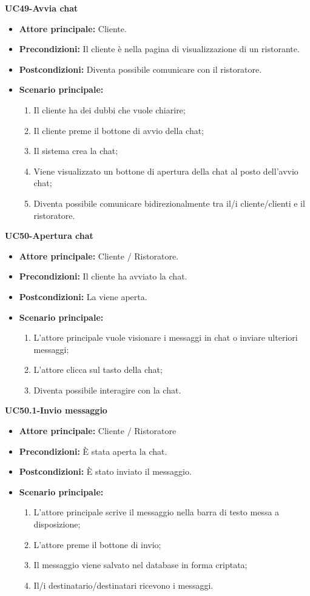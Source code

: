 
\textbf{UC49-Avvia chat}
\begin{itemize}
\item \textbf{Attore principale:} Cliente.
\item \textbf{Precondizioni:} Il cliente è nella pagina di visualizzazione di un ristorante.
\item \textbf{Postcondizioni:} Diventa possibile comunicare con il ristoratore.
\item \textbf{Scenario principale:}
\begin{enumerate}
    \item Il cliente ha dei dubbi che vuole chiarire;
    \item Il cliente preme il bottone di avvio della chat;
    \item Il sistema crea la chat;
    \item Viene visualizzato un bottone di apertura della chat al posto dell'avvio chat;
    \item Diventa possibile comunicare bidirezionalmente tra il/i cliente/clienti e il ristoratore.
\end{enumerate}
\end{itemize}

\textbf{UC50-Apertura chat}
\begin{itemize}
\item \textbf{Attore principale:} Cliente / Ristoratore.
\item \textbf{Precondizioni:} Il cliente ha avviato la chat.
\item \textbf{Postcondizioni:} La viene aperta. %
\item \textbf{Scenario principale:}
\begin{enumerate}
    \item L'attore principale vuole visionare i messaggi in chat o inviare ulteriori messaggi;
    \item L'attore clicca sul tasto della chat;
    \item Diventa possibile interagire con la chat.
\end{enumerate}
\end{itemize}

\textbf{UC50.1-Invio messaggio}
\begin{itemize}
\item \textbf{Attore principale:} Cliente / Ristoratore
\item \textbf{Precondizioni:} È stata aperta la chat.
\item \textbf{Postcondizioni:} È stato inviato il messaggio.
\item \textbf{Scenario principale:}
\begin{enumerate}
    \item L'attore principale scrive il messaggio nella barra di testo messa a disposizione;
    \item L'attore preme il bottone di invio;
    \item Il messaggio viene salvato nel database in forma criptata;
    \item Il/i destinatario/destinatari ricevono i messaggi.
\end{enumerate}
\end{itemize}


